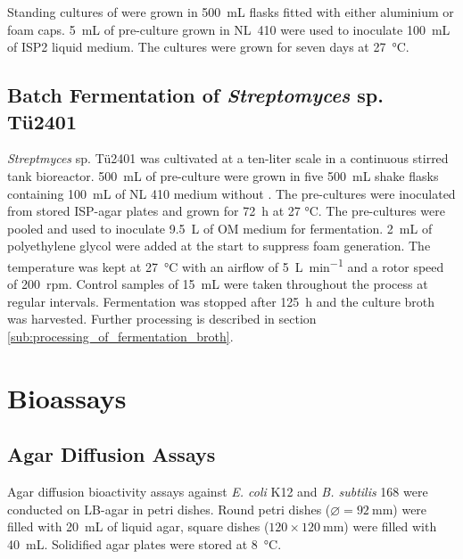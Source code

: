 Standing cultures of \tue were grown in \SI{500}{\milli\liter} flasks fitted with either aluminium or foam caps.
\SI{5}{\milli\liter} of pre-culture grown in NL~410 were used to inoculate \SI{100}{\milli\liter} of ISP2 liquid medium.
The cultures were grown for seven days at \SI{27}{\celsius}.


\subsection{Batch Fermentation of \emph{Streptomyces} sp. Tü2401} %
\label{sub:fermentation}

\textit{Streptmyces} sp. Tü2401 was cultivated at a ten-liter scale in a continuous stirred tank bioreactor.
\SI{500}{\milli\liter} of pre-culture were grown in five \SI{500}{\milli\liter} shake flasks containing \SI{100}{\milli\liter} of NL 410 medium without .
The pre-cultures were inoculated from stored ISP-agar plates and grown for \SI{72}{\hour} at 27 \si{\celsius}.
The pre-cultures were pooled and used to inoculate \SI{9.5}{\liter} of OM medium for fermentation.
\SI{2}{\milli\liter} of polyethylene glycol were added at the start to suppress foam generation.
The temperature was kept at \SI{27}{\celsius} with an airflow of \SI{5}{\liter\per\minute} and a rotor speed of 200~rpm.
Control samples of \SI{15}{\milli\liter} were taken throughout the process at regular intervals.
Fermentation was stopped after \SI{125}{\hour} and the culture broth was harvested.
Further processing is described in section \ref{sub:processing_of_fermentation_broth}.


\section{Bioassays} %
\label{sec:bioassays}

\subsection{Agar Diffusion Assays} %
\label{sub:agar_diffusion_bioactivity_assays}

Agar diffusion bioactivity assays against \emph{E. coli} K12 and \emph{B. subtilis} 168 were conducted on LB-agar in petri dishes.
Round petri dishes ($\varnothing=\SI{92}{\milli\meter}$) were filled with \SI{20}{\milli\liter} of liquid agar, square dishes ($120\times \SI{120}{\milli\meter}$) were filled with \SI{40}{\milli\liter}.
Solidified agar plates were stored at \SI{8}{\celsius}.

